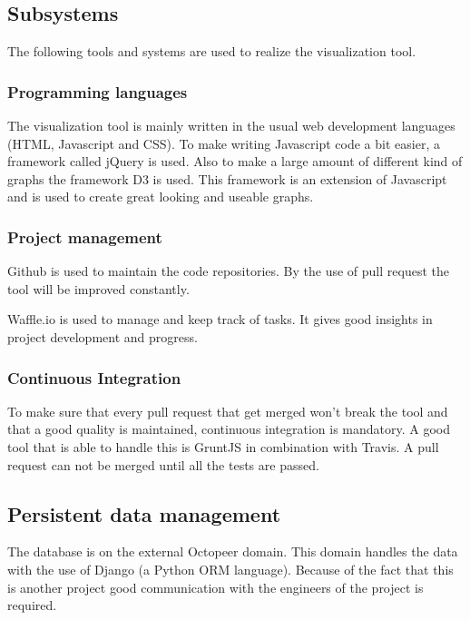 \documentclass{article}
\begin{document}
\subsection{Subsystems}

The following tools and systems are used to realize the visualization tool.

\subsubsection{Programming languages}

The visualization tool is mainly written in the usual web development languages (HTML, Javascript and CSS). To make writing Javascript code a bit easier, a framework called jQuery is used. Also to make a large amount of different kind of graphs the framework D3 is used. This framework is an extension of Javascript and is used to create great looking and useable graphs.

\subsubsection{Project management}

Github is used to maintain the code repositories. By the use of pull request the tool will be improved constantly.

Waffle.io is used to manage and keep track of tasks. It gives good insights in project development and progress.

\subsubsection{Continuous Integration}

To make sure that every pull request that get merged won't break the tool and that a good quality is maintained, continuous integration is mandatory. A good tool that is able to handle this is GruntJS in combination with Travis. A pull request can not be merged until all the tests are passed.

\subsection{Persistent data management}

The database is on the external Octopeer domain. This domain handles the data with the use of Django (a Python ORM language). Because of the fact that this is another project good communication with the engineers of the project is required.
\end{document}
